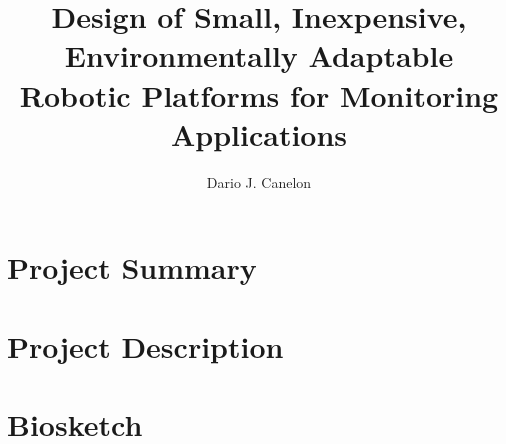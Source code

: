\documentclass[11pt,proposal,double]{pitthesis}
\title{\bf Design of Small, Inexpensive, Environmentally Adaptable Robotic Platforms for Monitoring Applications}
\author{Dario J. Canelon}			%
\date{}
\begin{document}

\maketitle		%




\tableofcontents

\chapter{Project Summary}
%

\chapter{Project Description}



%



\chapter*{Biosketch}



\end{document}
